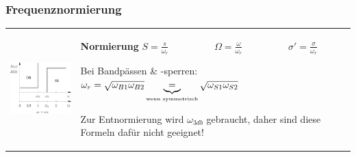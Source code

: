 \subsubsection{Frequenznormierung }
\begin{tabular}{ll}
\parbox{6cm}{
	\includegraphics[width=5cm]{./bilder/filter-freqnormierung.png}}
& \parbox{12cm}{
	\textbf{Normierung} \\
	$S=\frac{s}{\omega_{r}} \hspace{2cm} \Omega=\frac{\omega}{\omega_{r}} 
\hspace{2cm} \sigma'=\frac{\sigma}{\omega_{r}}$\\ 

	Bei Bandpässen \& -sperren: $\omega_r = \sqrt{\omega_{B1} \omega_{B2}}
	\underbrace{=}_{\text{\tiny{wenn symmetrisch}}} \sqrt{\omega_{S1} \omega_{S2}}$
	\\

	Zur Entnormierung wird $\omega_{3db}$ gebraucht, daher sind diese Formeln
	dafür nicht geeignet! \\
	}
\end{tabular}

